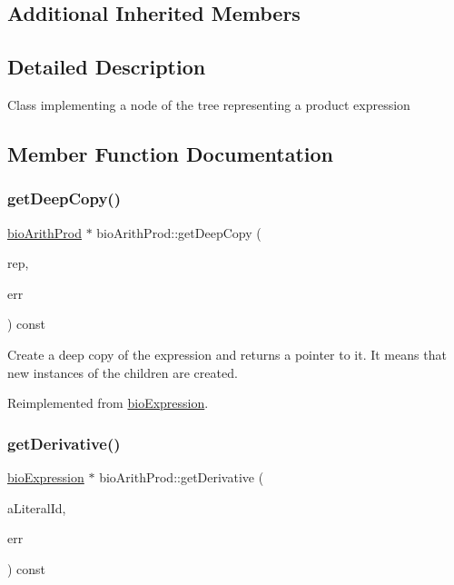 \subsection*{Additional Inherited Members}


\subsection{Detailed Description}
Class implementing a node of the tree representing a product expression 

\subsection{Member Function Documentation}
\mbox{\label{classbio_arith_prod_a55008811df00e22759086f4983362a26}} 
\subsubsection{\texorpdfstring{get\+Deep\+Copy()}{getDeepCopy()}}
{\footnotesize\ttfamily \hyperlink{classbio_arith_prod}{bio\+Arith\+Prod} $\ast$ bio\+Arith\+Prod\+::get\+Deep\+Copy (\begin{DoxyParamCaption}\item[{\hyperlink{classbio_expression_repository}{bio\+Expression\+Repository} $\ast$}]{rep,  }\item[{pat\+Error $\ast$\&}]{err }\end{DoxyParamCaption}) const\hspace{0.3cm}{\ttfamily [virtual]}}

Create a deep copy of the expression and returns a pointer to it. It means that new instances of the children are created. 

Reimplemented from \hyperlink{classbio_expression_a4ee1b8add634078a02eaae26cd40dcc8}{bio\+Expression}.

\mbox{\label{classbio_arith_prod_a1b086a865acfc23f3cd51566eaef8ddc}} 
\subsubsection{\texorpdfstring{get\+Derivative()}{getDerivative()}}
{\footnotesize\ttfamily \hyperlink{classbio_expression}{bio\+Expression} $\ast$ bio\+Arith\+Prod\+::get\+Derivative (\begin{DoxyParamCaption}\item[{pat\+U\+Long}]{a\+Literal\+Id,  }\item[{pat\+Error $\ast$\&}]{err }\end{DoxyParamCaption}) const\hspace{0.3cm}{\ttfamily [virtual]}}

